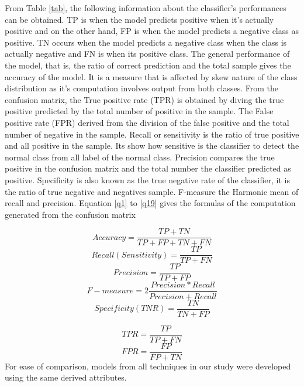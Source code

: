 \documentclass[final,5p,times,twocolumn,authoryear]{elsarticle}
\begin{document}
From Table \ref{tab}, the following information about the classifier's performances can be obtained. TP is when the model predicts positive when it's actually positive and on the other hand, FP is when the model predicts a negative class as positive. TN occurs when the model predicts a negative class when the class is actually negative and FN is when its positive class. The general performance of the model, that is, the ratio of correct prediction and the total sample gives the accuracy of the model. It is a measure that is affected by skew nature of the class distribution as it's computation involves output from both classes. From the confusion matrix, the True positive rate (TPR) is obtained by diving the true positive predicted by the total number of positive in the sample. The False positive rate (FPR) derived from the division of the false positive and the total number of negative in the sample. Recall or sensitivity is the ratio of true positive and all positive in the sample. Its show how sensitive is the classifier to detect the normal class from all label of the normal class. Precision compares the true positive in the confusion matrix and the total number the classifier predicted as positive. Specificity is also known as the true negative rate of the classifier, it is the ratio of true negative and negatives sample. F-measure the Harmonic mean of recall and precision. Equation \eqref{q1} to \eqref{q19} gives the  formulas of the  computation generated from the confusion matrix 

\begin{equation}\label{q1}
Accuracy = \frac{TP +TN}{TP +FP +TN+FN} 
\end{equation}
\begin{equation}\label{eqn11}
Recall(Sensitivity) = \frac{TP }{TP +FN} 
\end{equation}
\begin{equation}\label{eqn12}
Precision = \frac{TP}{TP +FP}
\end{equation}
\begin{equation}
F-measure = 2\frac{Precision*Recall}{Precision +Recall}
\end{equation}
\begin{equation}
Specificity(TNR) = \frac{TN}{TN +FP}
\end{equation}

\begin{equation}
TPR = \frac{TP }{TP +FN}
\end{equation}
\begin{equation}\label{q19}
FPR = \frac{FP}{FP +TN}
\end{equation}
For ease of
comparison, models from all techniques in our study were developed
using the same derived attributes.\\
\end{document}
